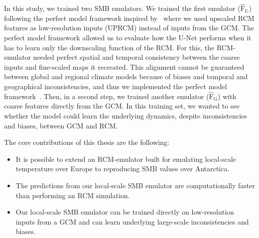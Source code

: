 \documentclass[a4paper,11pt,oneside]{report}
\begin{document}
In this study, we trained two SMB emulators. We trained the first emulator ($\operatorname{\mathrm{\hat{F}_U}}$) following the perfect model framework inspired by~\cite{Doury} where we used upscaled RCM features as low-resolution inputs (UPRCM) instead of inputs from the GCM. The perfect model framework allowed us to evaluate how the U-Net performs when it has to learn only the downscaling function of the RCM. For this, the RCM-emulator needed perfect spatial and temporal consistency between the coarse inputs and fine-scaled maps it recreated. This alignment cannot be guaranteed between global and regional climate models because of biases and temporal and geographical inconsistencies, and thus we implemented the perfect model framework~\cite{Doury, Sanchez2009, Sanchez2018}. Then, in a second step, we trained another emulator ($\operatorname{\mathrm{\hat{F}_G}}$) with coarse features directly from the GCM. In this training set, we wanted to see whether the model could learn the underlying dynamics, despite inconsistencies and biases, between GCM and RCM. 
    
    

    

The core contributions of this thesis are the following: 
    \begin{itemize}
        \item It is possible to extend an RCM-emulator built for emulating local-scale temperature over Europe to reproducing SMB values over Antarctica.
        \item The predictions from our local-scale SMB emulator are computationally faster than performing an RCM simulation. 
        \item Our local-scale SMB emulator can be trained directly on low-resolution inputs from a GCM and can learn underlying large-scale inconsistencies and biases.
        \end{itemize}
\end{document}
